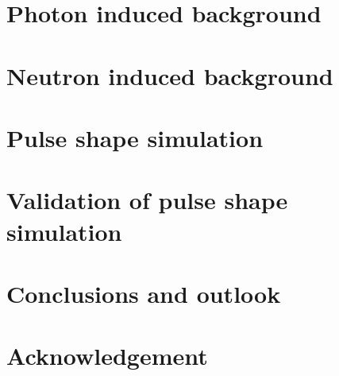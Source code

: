 \documentclass[11pt,a4paper]{book}
\begin{document}
\chapter{Photon induced background}
\label{cha:photon}

\clearpage{\pagestyle{empty}\cleardoublepage}

\chapter{Neutron induced background}
\label{cha:neutron}

\clearpage{\pagestyle{empty}\cleardoublepage}

\chapter{Pulse shape simulation}
\label{cha:pss}

\clearpage{\pagestyle{empty}\cleardoublepage}

\chapter{Validation of pulse shape simulation}
\label{cha:psa}

\clearpage{\pagestyle{empty}\cleardoublepage}

\chapter{Conclusions and outlook}
\label{cha:con}

\clearpage{\pagestyle{empty}\cleardoublepage}

\chapter*{Acknowledgement}
\label{cha:ack}
 
\clearpage{\pagestyle{empty}\cleardoublepage}


\end{document}
